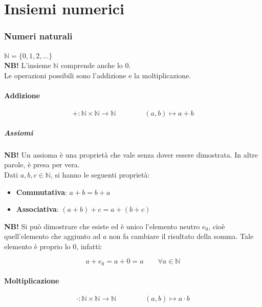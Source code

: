 \documentclass{article}
\begin{document}
\part{Insiemi numerici}
\section{Numeri naturali}
$\mathbb{N} = \{0, 1, 2, ...\}$ \\

\noindent\textbf{NB!} L'insieme $\mathbb{N}$ comprende anche lo 0. \\

\noindent Le operazioni possibili sono l'addizione e la moltiplicazione.

\subsection{Addizione}
\begin{equation*}
    +: \mathbb{N} \times \mathbb{N} \xrightarrow{} \mathbb{N} \qquad \qquad (a,b) \longmapsto a + b
\end{equation*}

\subsubsection{Assiomi}
\noindent\textbf{NB!} Un assioma è una proprietà che vale senza dover essere dimostrata. In altre parole, è presa per vera. \\

\noindent Dati $a, b, c \in \mathbb{N}$, si hanno le seguenti proprietà: 

\begin{itemize}
    \item \textbf{Commutativa}: $a + b = b + a$
    \item \textbf{Associativa}: $(a + b) + c = a + (b + c)$
\end{itemize}

\noindent\textbf{NB!} Si può dimostrare che esiste ed è unico l'elemento neutro $e_0$, cioè quell'elemento che aggiunto ad $a$ non fa cambiare il risultato della somma. Tale elemento è proprio lo 0, infatti:

\begin{equation*}
    a + e_0 = a + 0 = a \qquad \forall a \in \mathbb{N}
\end{equation*}

\subsection{Moltiplicazione}
\begin{equation*}
    \cdot: \mathbb{N} \times \mathbb{N} \xrightarrow{} \mathbb{N} \qquad \qquad (a,b) \longmapsto a \cdot b
\end{equation*}
\end{document}
